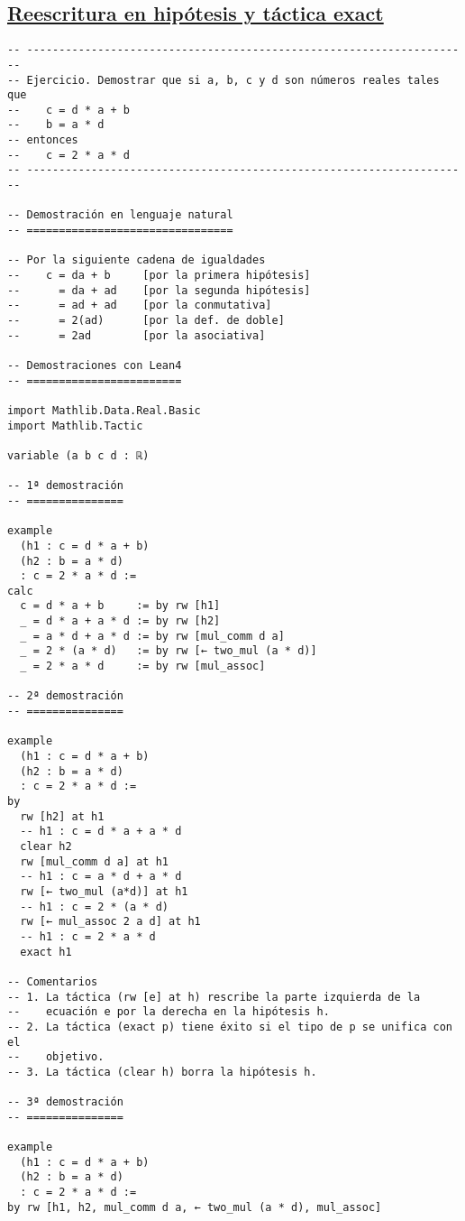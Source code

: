\subsection{\href{./src/Basicos/Reescritura\_en\_hipotesis\_y\_tactica\_exact.lean}{Reescritura en hipótesis y táctica exact}}
\label{sec:orge1c78fc}
\begin{verbatim}
-- ---------------------------------------------------------------------
-- Ejercicio. Demostrar que si a, b, c y d son números reales tales que
--    c = d * a + b
--    b = a * d
-- entonces
--    c = 2 * a * d
-- ---------------------------------------------------------------------

-- Demostración en lenguaje natural
-- ================================

-- Por la siguiente cadena de igualdades
--    c = da + b     [por la primera hipótesis]
--      = da + ad    [por la segunda hipótesis]
--      = ad + ad    [por la conmutativa]
--      = 2(ad)      [por la def. de doble]
--      = 2ad        [por la asociativa]

-- Demostraciones con Lean4
-- ========================

import Mathlib.Data.Real.Basic
import Mathlib.Tactic

variable (a b c d : ℝ)

-- 1ª demostración
-- ===============

example
  (h1 : c = d * a + b)
  (h2 : b = a * d)
  : c = 2 * a * d :=
calc
  c = d * a + b     := by rw [h1]
  _ = d * a + a * d := by rw [h2]
  _ = a * d + a * d := by rw [mul_comm d a]
  _ = 2 * (a * d)   := by rw [← two_mul (a * d)]
  _ = 2 * a * d     := by rw [mul_assoc]

-- 2ª demostración
-- ===============

example
  (h1 : c = d * a + b)
  (h2 : b = a * d)
  : c = 2 * a * d :=
by
  rw [h2] at h1
  -- h1 : c = d * a + a * d
  clear h2
  rw [mul_comm d a] at h1
  -- h1 : c = a * d + a * d
  rw [← two_mul (a*d)] at h1
  -- h1 : c = 2 * (a * d)
  rw [← mul_assoc 2 a d] at h1
  -- h1 : c = 2 * a * d
  exact h1

-- Comentarios
-- 1. La táctica (rw [e] at h) rescribe la parte izquierda de la
--    ecuación e por la derecha en la hipótesis h.
-- 2. La táctica (exact p) tiene éxito si el tipo de p se unifica con el
--    objetivo.
-- 3. La táctica (clear h) borra la hipótesis h.

-- 3ª demostración
-- ===============

example
  (h1 : c = d * a + b)
  (h2 : b = a * d)
  : c = 2 * a * d :=
by rw [h1, h2, mul_comm d a, ← two_mul (a * d), mul_assoc]


\end{verbatim}
